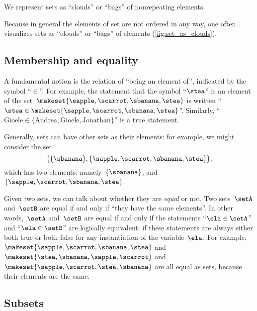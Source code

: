 \begin{marginfigure}
    \centering
    \caption{We represent sets as ``clouds'' or ``bags'' of nonrepeating elements.}
    \label{fig:set_as_clouds}
\end{marginfigure}

Because in general the elements of set are not ordered in any way, one often visualizes sets as ``clouds'' or ``bags'' of elements (\cref{fig:set_as_clouds}).




\subsection{Membership and equality}

A fundamental notion is the relation of ``being an element of'', indicated by the symbol ``$\in$''.
For example, the statement that the symbol ``$\stea$'' is an element of the set~$\makeset{ \sapple, \scarrot, \sbanana, \stea }$ is written ``$\stea \in \makeset{ \sapple, \scarrot, \sbanana, \stea }$''.
Similarly, ``$\text{Gioele} \in \{ \text{Andrea}, \text{Gioele}, \text{Jonathan} \}$'' is a true statement.


Generally, sets can have other sets as their elements: for example, we might consider the set
%
\begin{equation*}
    \{ \{ \sbanana \}, \{ \sapple, \scarrot, \sbanana, \stea \} \},
\end{equation*}
%
which has two elements: namely~$\{ \sbanana \}$, and~$\{ \sapple, \scarrot, \sbanana, \stea \}$.

Given  two sets, we can talk about whether they are \emph{equal} or not.
Two sets~$\setA$ and~$\setB$ are equal if and only if ``they have the same elements''.
In other words,~$\setA$ and~$\setB$ are equal if and only if the statements
``$\ela \in \setA$'' and ``$\ela \in \setB$'' are logically equivalent:
if these statements are always either both true or both false for any instantiation of the variable~$\ela$.
For example, $\makeset{ \sapple, \scarrot, \sbanana, \stea }$ and~$\makeset{ \stea, \sbanana, \sapple, \scarrot}$ and~$\makeset{ \sapple, \scarrot, \stea, \sbanana }$ are all equal as sets, because their elements are the same.


\subsection{Subsets}

